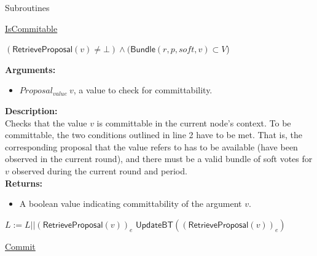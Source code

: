 \documentclass[10pt,a4paper]{article}
\begin{document}
\begin{section}{Subroutines}

\begin{algorithm}[H]
    \caption{\underline{IsCommitable}}
    \label{algo:is-commitable}
    \begin{algorithmic}[1]

    \Return $(\mathsf{RetrieveProposal}(v) \neq \bot) \land (\mathsf{Bundle}(r,p,soft,v) \subset V$)

    \EndFunction
    \end{algorithmic}
\end{algorithm}


\noindent \textbf{Arguments:}
\begin{itemize}
    \item $Proposal_{value} \ v$, a value to check for committability.
  \end{itemize}

\noindent \textbf{Description:}\\
Checks that the value $v$ is committable in the current node's context.
To be committable, the two conditions outlined in line 2 have to be met.
That is, the corresponding proposal that the value refers to has to be
available (have been observed in the current round), and there must
be a valid bundle of soft votes for $v$ observed during the current round and
period. \\

\noindent \textbf{Returns:}
\begin{itemize}
    \item A boolean value indicating committability of the argument $v$.
  \end{itemize}


\begin{algorithm}[H]
    \begin{algorithmic}[1]

    \State $L := L || (\mathsf{RetrieveProposal}(v))_e$
    \State $\mathsf{UpdateBT}((\mathsf{RetrieveProposal}(v))_e)$

    \EndFunction
    \end{algorithmic}
    \caption{\underline{Commit}}
\end{algorithm}



\end{section}
\end{document}

